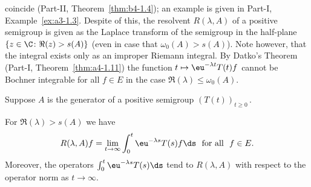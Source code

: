 coincide (\cf Part-II, Theorem~\ref{thm:b4-1.4}); an example is given in Part-I, Example~\ref{ex:a3-1.3}.
Despite of this, the resolvent $R(\lambda,A)$ of a positive semigroup is given as the Laplace transform%
of the semigroup in the half-plane $\{z \in \C  \colon \Re(z) > s(A)\}$ (even in case that $\omega_0(A) > s(A)$).
Note however, that the integral exists only as an improper Riemann integral.
By Datko's Theorem (Part-I, Theorem~\ref{thm:a4-1.11}) the function $t \mapsto \eu^{-\lambda t}T(t)f$ cannot be Bochner integrable for all $f \in E$ in the case $\Re(\lambda) \leq \omega_0(A)$.
\begin{theorem}\label{thm:c3-1.2}
	Suppose $A$ is the generator of a positive semigroup $(T(t))_{t\geq 0}$\,.
	
	For\/ $\Re(\lambda) > s(A)$ we have
	\begin{equation}\label{eq:c3-1.1}
		R(\lambda,A)f = \lim_{t\to\infty} \int_{0}^t \eu^{-\lambda s} T(s)f \ds  \ \text{ for all } \ f \in E.
	\end{equation}
	Moreover, the operators $\int_{0}^t \eu^{-\lambda s} T(s) \ds $ tend to $R(\lambda,A)$ with respect to the operator norm as $t \to \infty$.
\end{theorem}
